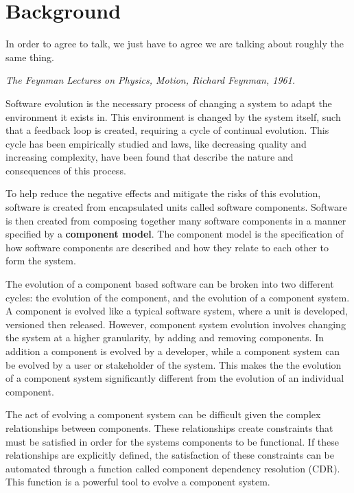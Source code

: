 \chapter{Background}
\label{background}
\epigraph{
In order to agree to talk, we just have to agree we are talking about roughly the same thing.
}
{\textit{The Feynman Lectures on Physics, Motion, Richard Feynman, 1961.}}

Software evolution is the necessary process of changing a system to adapt the environment it exists in.
This environment is changed by the system itself, such that a feedback loop \citep{lehman1980} is created, requiring a cycle of continual evolution.
This cycle has been empirically studied and laws, like decreasing quality and increasing complexity, have been found that describe the nature and consequences of this process.  

To help reduce the negative effects and mitigate the risks of this evolution, software is created from encapsulated units called software components. 
Software is then created from composing together many software components in a manner specified by a \textbf{component model}.
The component model is the specification of how software components are described and how they relate to each other to form the system.

The evolution of a component based software can be broken into two different cycles: the evolution of the component, and the evolution of a component system. 
A component is evolved like a typical software system, where a unit is developed, versioned then released.
However, component system evolution involves changing the system at a higher granularity, by adding and removing components.
In addition a component is evolved by a developer, while a component system can be evolved by a user or stakeholder of the system.
This makes the the evolution of a component system significantly different from the evolution of an individual component.

The act of evolving a component system can be difficult given the complex relationships between components.
These relationships create constraints that must be satisfied in order for the systems components to be functional.
If these relationships are explicitly defined, the satisfaction of these constraints can be automated through a function called component dependency resolution (CDR).
This function is a powerful tool to evolve a component system.

